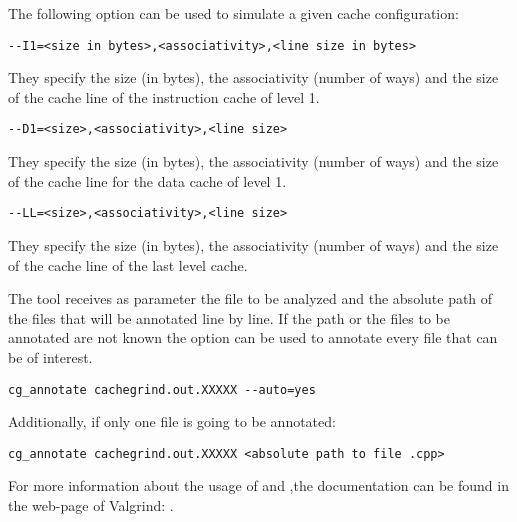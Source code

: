 The following option can be used to simulate a given cache configuration:

\begin{lstlisting}[style=terminal,aboveskip=1em,belowskip=1em]
--I1=<size in bytes>,<associativity>,<line size in bytes>
\end{lstlisting}

They specify the size (in bytes), the associativity (number of ways) and the
size of the cache line of the instruction cache of level 1.

\begin{lstlisting}[style=terminal,aboveskip=1em,belowskip=1em]
--D1=<size>,<associativity>,<line size>
\end{lstlisting}

They specify the size (in bytes), the associativity (number of ways) and the
size of the cache line for the data cache of level 1.

\begin{lstlisting}[style=terminal,aboveskip=1em,belowskip=1em]
--LL=<size>,<associativity>,<line size>
\end{lstlisting}

They specify the size (in bytes), the associativity (number of ways) and the
size of the cache line of the last level cache.

The tool  receives as parameter the file to be analyzed and
the absolute path of the files that will be annotated line by line.  If the path
or the files to be annotated are not known the option  can be
used to annotate every file that can be of interest.

\begin{lstlisting}[style=terminal,aboveskip=1em,belowskip=1em]
cg_annotate cachegrind.out.XXXXX --auto=yes
\end{lstlisting}

\vspace{1em}

Additionally, if only one file is going to be annotated: 

\begin{lstlisting}[style=terminal,aboveskip=1em,belowskip=1em]
cg_annotate cachegrind.out.XXXXX <absolute path to file .cpp>
\end{lstlisting}

For more information about the usage of  and
,the documentation can be found in the web-page of Valgrind:
.
